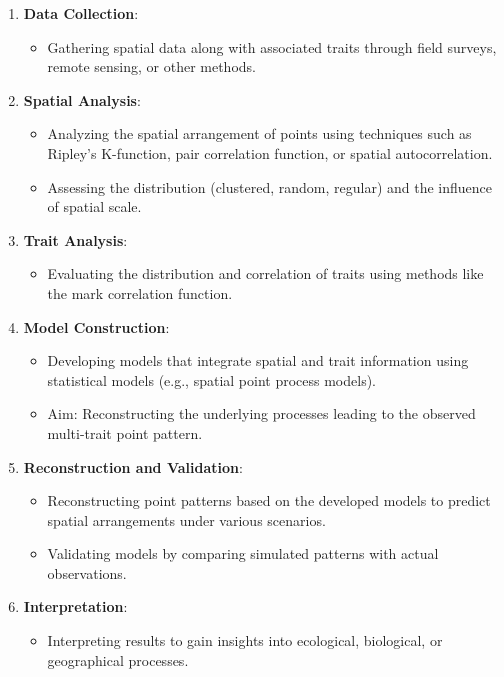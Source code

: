 \documentclass[
  letterpaper,
  DIV=11,
  numbers=noendperiod]{scrreprt}
\providecommand{\tightlist}{%
  \setlength{\itemsep}{0pt}\setlength{\parskip}{0pt}}\usepackage{longtable,booktabs,array}
\begin{document}
\begin{enumerate}
\def\labelenumi{\arabic{enumi}.}
\item
  \textbf{Data Collection}:

  \begin{itemize}
  \tightlist
  \item
    Gathering spatial data along with associated traits through field
    surveys, remote sensing, or other methods.
  \end{itemize}
\item
  \textbf{Spatial Analysis}:

  \begin{itemize}
  \item
    Analyzing the spatial arrangement of points using techniques such as
    Ripley's K-function, pair correlation function, or spatial
    autocorrelation.
  \item
    Assessing the distribution (clustered, random, regular) and the
    influence of spatial scale.
  \end{itemize}
\item
  \textbf{Trait Analysis}:

  \begin{itemize}
  \tightlist
  \item
    Evaluating the distribution and correlation of traits using methods
    like the mark correlation function.
  \end{itemize}
\item
  \textbf{Model Construction}:

  \begin{itemize}
  \item
    Developing models that integrate spatial and trait information using
    statistical models (e.g., spatial point process models).
  \item
    Aim: Reconstructing the underlying processes leading to the observed
    multi-trait point pattern.
  \end{itemize}
\item
  \textbf{Reconstruction and Validation}:

  \begin{itemize}
  \item
    Reconstructing point patterns based on the developed models to
    predict spatial arrangements under various scenarios.
  \item
    Validating models by comparing simulated patterns with actual
    observations.
  \end{itemize}
\item
  \textbf{Interpretation}:

  \begin{itemize}
  \tightlist
  \item
    Interpreting results to gain insights into ecological, biological,
    or geographical processes.
  \end{itemize}
\end{enumerate}
\end{document}
